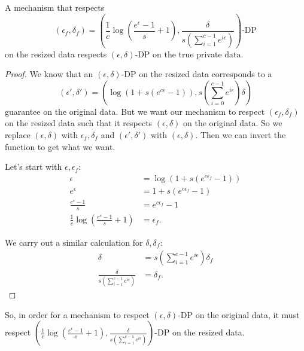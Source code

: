 \documentclass[11pt]{scrartcl} %
\begin{document}
\begin{theorem}
    A mechanism that respects 
    \[ (\epsilon_f, \delta_f) = \left( \frac{1}{c}\log\left(\frac{e^{\epsilon}-1}{s} + 1 \right), \frac{\delta}{s\left(\sum_{i=1}^{c-1}e^{i \epsilon}\right)} \right)\text{-DP} \] 
    on the resized data respects $(\epsilon, \delta)$-DP on the true private data.
    \begin{proof}
        We know that an $(\epsilon, \delta)$-DP on the resized data corresponds to a 
        \[ (\epsilon', \delta') = \left(\log\left(1+s\left(e^{c\epsilon}-1\right) \right), s\left(\sum_{i=0}^{c-1}e^{i \epsilon}\right)\delta \right) \]
        guarantee on the original data. But we want our mechanism to respect $(\epsilon_f, \delta_f)$ on the resized data such that it 
        respects $(\epsilon, \delta)$ on the original data. So we replace $(\epsilon, \delta)$ with 
        $\epsilon_f, \delta_f$ and $(\epsilon', \delta')$ with $(\epsilon, \delta)$. 
        Then we can invert the function to get what we want. \newline 

        Let's start with $\epsilon, \epsilon_f$:
        \begin{align*}
            \epsilon &= \log\left(1+s\left(e^{c\epsilon_f}-1\right)\right) \\
            e^{\epsilon} &= 1+s\left(e^{c\epsilon_f}-1\right) \\
            \frac{e^{\epsilon}-1}{s} &= e^{c\epsilon_f}-1 \\
            \frac{1}{c}\log\left(\frac{e^{\epsilon}-1}{s} + 1 \right) &= \epsilon_f.
        \end{align*}

        We carry out a similar calculation for $\delta, \delta_f$:
        \begin{align*}
            \delta &= s\left(\sum_{i=1}^{c-1}e^{i \epsilon}\right)\delta_f \\
            \frac{\delta}{s\left(\sum_{i=1}^{c-1}e^{i \epsilon}\right)} &= \delta_f.
        \end{align*}
    \end{proof} 
    So, in order for a mechanism to respect $(\epsilon, \delta)$-DP on the original data, it must respect 
    $\left( \frac{1}{c}\log\left(\frac{e^{\epsilon}-1}{s} + 1 \right), \frac{\delta}{s\left(\sum_{i=1}^{c-1}e^{i \epsilon}\right)} \right)$-DP 
    on the resized data.
\end{theorem}
\end{document}
